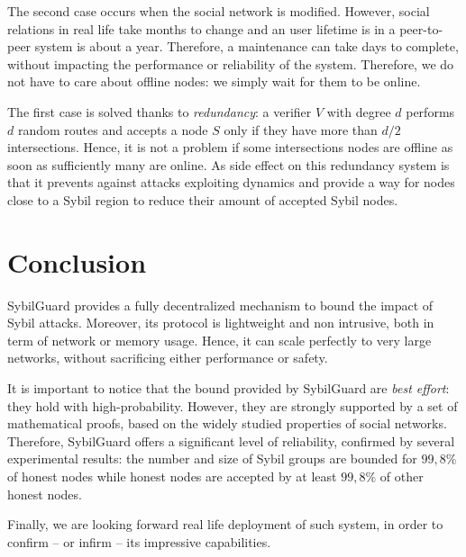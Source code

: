 \documentclass[a4paper,11pt]{article}
\begin{document}
The second case occurs when the social network is modified. However,
social relations in real life take months to change and an user
lifetime is in a peer-to-peer system is about a year. Therefore, a
maintenance can take days to complete, without impacting the
performance or reliability of the system. Therefore, we do not have to
care about offline nodes: we simply wait for them to be online.

The first case is solved thanks to \emph{redundancy}: a verifier $V$
with degree $d$ performs $d$ random routes and accepts a node $S$ only
if they have more than $d/2$ intersections.  Hence, it is not a
problem if some intersections nodes are offline as soon as
sufficiently many are online. As side effect on this redundancy system
is that it prevents against attacks exploiting dynamics and provide a
way for nodes close to a Sybil region to reduce their amount of
accepted Sybil nodes.

\section*{Conclusion}


SybilGuard provides a fully decentralized mechanism to bound the
impact of Sybil attacks. Moreover, its protocol is lightweight and non
intrusive, both in term of network or memory usage. Hence, it can
scale perfectly to very large networks, without sacrificing either
performance or safety.


It is important to notice that the bound provided by SybilGuard are
\emph{best effort}: they hold with high-probability. However, they are
strongly supported by a set of mathematical proofs, based on the
widely studied properties of social networks. Therefore, SybilGuard
offers a significant level of reliability, confirmed by several
experimental results: the number and size of Sybil groups are bounded
for $99,8\%$ of honest nodes while honest nodes are accepted by at
least $99,8\%$ of other honest nodes.


Finally, we are looking forward real life deployment of such system,
in order to confirm -- or infirm -- its impressive capabilities.



{}

\end{document}
